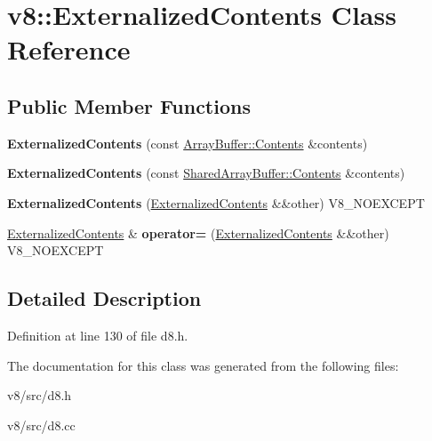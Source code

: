 \hypertarget{classv8_1_1ExternalizedContents}{}\section{v8\+:\+:Externalized\+Contents Class Reference}
\label{classv8_1_1ExternalizedContents}
\subsection*{Public Member Functions}
\begin{DoxyCompactItemize}
\item 
\mbox{\label{classv8_1_1ExternalizedContents_a023bccd3d48390e742e5fbf1a2232734}} 
{\bfseries Externalized\+Contents} (const \mbox{\hyperlink{classv8_1_1ArrayBuffer_1_1Contents}{Array\+Buffer\+::\+Contents}} \&contents)
\item 
\mbox{\label{classv8_1_1ExternalizedContents_a73382ba6d68648e5f1619a1a695204e6}} 
{\bfseries Externalized\+Contents} (const \mbox{\hyperlink{classv8_1_1SharedArrayBuffer_1_1Contents}{Shared\+Array\+Buffer\+::\+Contents}} \&contents)
\item 
\mbox{\label{classv8_1_1ExternalizedContents_a7e9f842a975d12e253fefc7f6d34429a}} 
{\bfseries Externalized\+Contents} (\mbox{\hyperlink{classv8_1_1ExternalizedContents}{Externalized\+Contents}} \&\&other) V8\+\_\+\+N\+O\+E\+X\+C\+E\+PT
\item 
\mbox{\label{classv8_1_1ExternalizedContents_a542d77d6719fb054953ac48c74fae52e}} 
\mbox{\hyperlink{classv8_1_1ExternalizedContents}{Externalized\+Contents}} \& {\bfseries operator=} (\mbox{\hyperlink{classv8_1_1ExternalizedContents}{Externalized\+Contents}} \&\&other) V8\+\_\+\+N\+O\+E\+X\+C\+E\+PT
\end{DoxyCompactItemize}


\subsection{Detailed Description}


Definition at line 130 of file d8.\+h.



The documentation for this class was generated from the following files\+:\begin{DoxyCompactItemize}
\item 
v8/src/d8.\+h\item 
v8/src/d8.\+cc\end{DoxyCompactItemize}
